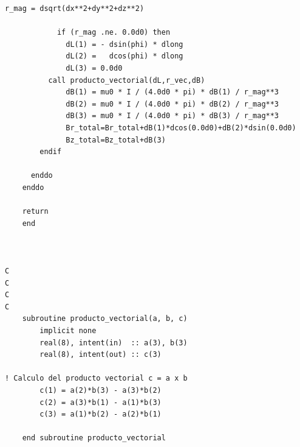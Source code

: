 \documentclass[11pt]{article}
\numberwithin{equation}{section}
\numberwithin{figure}{section}
\numberwithin{table}{section}
\begin{document}
\begin{lstlisting}[caption={Camp d'inducció numèric}, label={lst:prog_B}]
            r_mag = dsqrt(dx**2+dy**2+dz**2)

            if (r_mag .ne. 0.0d0) then
              dL(1) = - dsin(phi) * dlong
              dL(2) =   dcos(phi) * dlong
              dL(3) = 0.0d0
	      call producto_vectorial(dL,r_vec,dB)
              dB(1) = mu0 * I / (4.0d0 * pi) * dB(1) / r_mag**3
              dB(2) = mu0 * I / (4.0d0 * pi) * dB(2) / r_mag**3
              dB(3) = mu0 * I / (4.0d0 * pi) * dB(3) / r_mag**3
              Br_total=Br_total+dB(1)*dcos(0.0d0)+dB(2)*dsin(0.0d0)
              Bz_total=Bz_total+dB(3)
	    endif

	  enddo
	enddo

	return
	end



C
C
C
C
	subroutine producto_vectorial(a, b, c)
    	implicit none
    	real(8), intent(in)  :: a(3), b(3)
    	real(8), intent(out) :: c(3)

! Calculo del producto vectorial c = a x b
    	c(1) = a(2)*b(3) - a(3)*b(2)
    	c(2) = a(3)*b(1) - a(1)*b(3)
    	c(3) = a(1)*b(2) - a(2)*b(1)

	end subroutine producto_vectorial
\end{lstlisting}
\end{document}
